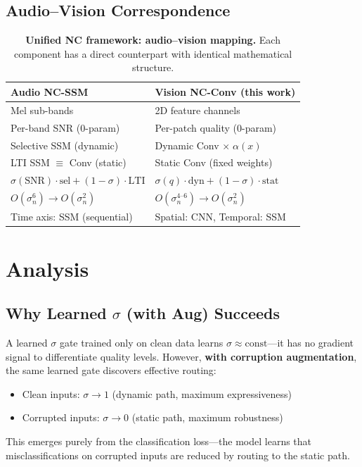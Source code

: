 \documentclass[10pt,twocolumn,letterpaper]{article}
\begin{document}
\subsection{Audio--Vision Correspondence}

\begin{table}[t]
\centering
\caption{\textbf{Unified NC framework: audio--vision mapping.} Each component has a direct counterpart with identical mathematical structure.}
\label{tab:mapping}
\setlength{\tabcolsep}{3pt}
\footnotesize
\begin{tabular}{@{}ll@{}}
\toprule
\textbf{Audio NC-SSM~\cite{choi2026ncssm}} & \textbf{Vision NC-Conv (this work)} \\
\midrule
Mel sub-bands & 2D feature channels \\
Per-band SNR (0-param) & Per-patch quality (0-param) \\
Selective SSM (dynamic) & Dynamic Conv $\times\;\alpha(x)$ \\
LTI SSM $\equiv$ Conv (static) & Static Conv (fixed weights) \\
$\sigma(\text{SNR}) \cdot \text{sel} + (1{-}\sigma) \cdot \text{LTI}$ & $\sigma(q) \cdot \text{dyn} + (1{-}\sigma) \cdot \text{stat}$ \\
$O(\sigma_n^6) \to O(\sigma_n^2)$ & $O(\sigma_n^{4\text{--}6}) \to O(\sigma_n^2)$ \\
Time axis: SSM (sequential) & Spatial: CNN, Temporal: SSM \\
\bottomrule
\end{tabular}
\end{table}


\section{Analysis}
\label{sec:analysis}

\subsection{Why Learned $\sigma$ (with Aug) Succeeds}

A learned $\sigma$ gate trained only on clean data learns $\sigma \approx \text{const}$---it has no gradient signal to differentiate quality levels.
However, \textbf{with corruption augmentation}, the same learned gate discovers effective routing:
\begin{itemize}
\setlength\itemsep{0pt}
\item Clean inputs: $\sigma \to 1$ (dynamic path, maximum expressiveness)
\item Corrupted inputs: $\sigma \to 0$ (static path, maximum robustness)
\end{itemize}
This emerges purely from the classification loss---the model learns that misclassifications on corrupted inputs are reduced by routing to the static path.
\end{document}
